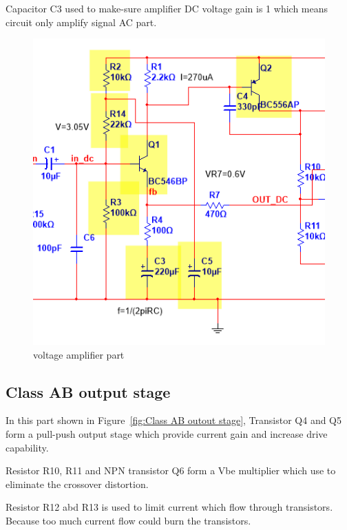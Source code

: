 Capacitor C3 used to make-sure amplifier DC voltage gain is 1 which means circuit only amplify signal AC part.

\begin{figure}[htbp]
	\centering
	\includegraphics[scale=0.8]{"../Photo/Chap5/voltage amplifier part"}
	\caption{voltage amplifier part }
	\label{fig:voltage amplifier part}
\end{figure}

\subsection{Class AB output stage}  

In this part shown in Figure~\ref{fig:Class AB outout stage}, Transistor Q4 and Q5 form a pull-push output stage which provide current gain and increase drive capability.

Resistor R10, R11 and NPN transistor Q6 form a Vbe multiplier which use to eliminate the crossover distortion.

Resistor R12 abd R13 is used to limit current which flow through transistors. Because too much current flow could burn the transistors.


